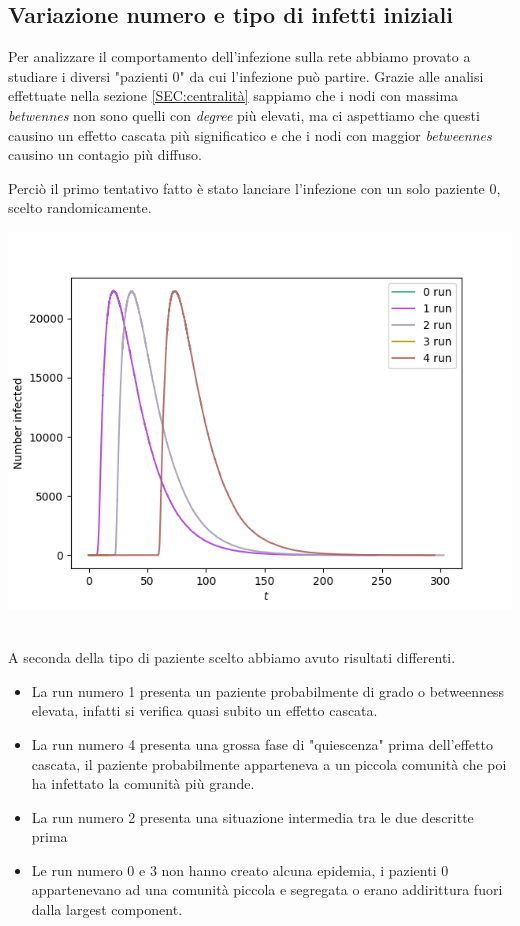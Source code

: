 \documentclass[a4paper]{article}
\begin{document}
\subsection{Variazione numero e tipo di infetti iniziali}
Per analizzare il comportamento dell'infezione sulla rete abbiamo provato a studiare i diversi "pazienti 0" da cui l'infezione può partire.
Grazie alle analisi effettuate nella sezione \ref{SEC:centralità} sappiamo che i nodi con massima \textit{betwennes} non sono quelli con \textit{degree} più elevati, ma ci aspettiamo che questi causino un effetto cascata più significatico e che i nodi con maggior \textit{betweennes} causino un contagio più diffuso.

Perciò il primo tentativo fatto è stato lanciare l'infezione con un solo paziente 0, scelto randomicamente.\\
\begin{centering}\includegraphics[width=1\textwidth]{1_random.png}\end{centering}\\
A seconda della tipo di paziente scelto abbiamo avuto risultati differenti.
\begin{itemize}
	\item La run numero 1 presenta un paziente probabilmente di grado o betweenness elevata, infatti si verifica quasi subito un effetto cascata.
	\item La run numero 4 presenta una grossa fase di "quiescenza" prima dell'effetto cascata, il paziente probabilmente apparteneva a un piccola comunità che poi ha infettato la comunità più grande.
	\item La run numero 2 presenta una situazione intermedia tra le due descritte prima
	\item Le run numero 0 e 3 non hanno creato alcuna epidemia, i pazienti 0 appartenevano ad una comunità piccola e segregata o erano addirittura fuori dalla largest component.
\end{itemize}
\end{document}
